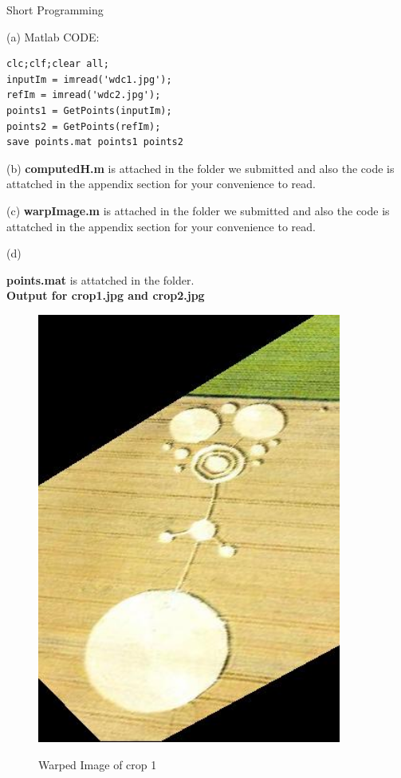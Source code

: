 \documentclass[a4paper,12pt]{article}
\begin{document}
\begin{section}{Short Programming}
\begin{subsection}{(a)}
Matlab CODE:\\
\begin{lstlisting}[frame=single]  % Start your code-block
%% (a)
clc;clf;clear all;
inputIm = imread('wdc1.jpg');
refIm = imread('wdc2.jpg');
points1 = GetPoints(inputIm);
points2 = GetPoints(refIm);
save points.mat points1 points2 

\end{lstlisting}


\end{subsection}

\begin{subsection}{(b)}
\textbf{computedH.m} is attached in the folder we submitted and also the code is attatched in the appendix section for your convenience to read.  


\end{subsection}

\begin{subsection}{(c)}
\textbf{warpImage.m} is attached in the folder we submitted and also the code is attatched in the appendix section for your convenience to read.  


\end{subsection}

\clearpage
\begin{subsection}{(d)}

\textbf{points.mat} is attatched in the folder.
\\
\textbf{Output for crop1.jpg and crop2.jpg}\\

 \begin{figure}[!htb]
       \center
       {\includegraphics[width=10cm]
       {crop_warp.png}}
        \caption{Warped Image of crop 1}
      \end{figure}




\end{subsection}
\end{section}
\end{document}
